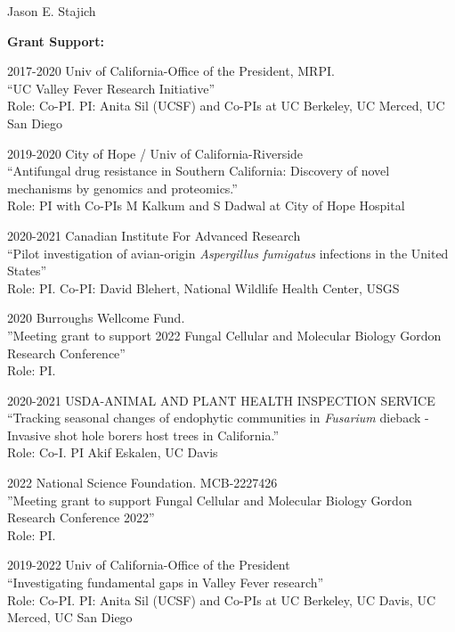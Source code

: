 \documentclass[10pt]{article}
\begin{document}
\begin{cv}{\centerline{Jason E. Stajich}}
\begin{cvlistcompact}{\bf Grant Support:}
\item [2017-2020] Univ of California-Office of the President, MRPI. \\
``UC Valley Fever Research Initiative'' \\
Role: Co-PI.  PI: Anita Sil (UCSF) and Co-PIs at UC Berkeley, UC Merced,
UC San Diego

\item [2019-2020] City of Hope / Univ of California-Riverside \\
``Antifungal drug resistance in Southern California: Discovery of
  novel mechanisms by genomics and proteomics.'' \\
Role: PI with Co-PIs M Kalkum and S Dadwal at City of Hope Hospital

\item [2020-2021] Canadian Institute For Advanced Research \\
  ``Pilot investigation of avian-origin \textit{Aspergillus fumigatus} infections
in the United States'' \\
Role: PI. Co-PI: David Blehert, National Wildlife Health Center, USGS

\item [2020] Burroughs Wellcome Fund. \\
''Meeting grant to support 2022 Fungal Cellular and Molecular Biology Gordon Research Conference'' \\
Role: PI.

\item [2020-2021] USDA-ANIMAL AND PLANT HEALTH INSPECTION SERVICE \\
``Tracking seasonal changes of endophytic communities in \textit{Fusarium} dieback - Invasive shot hole borers host trees in California.'' \\
Role: Co-I. PI Akif Eskalen, UC Davis

\item [2022] National Science Foundation. MCB-2227426 \\
''Meeting grant to support Fungal Cellular and Molecular Biology Gordon Research Conference 2022'' \\
Role: PI.

\item [2019-2022] Univ of California-Office of the President \\
``Investigating fundamental gaps in Valley Fever research'' \\
Role: Co-PI.  PI: Anita Sil (UCSF) and Co-PIs at UC Berkeley, UC
Davis, UC Merced, UC San Diego


\end{cvlistcompact}
\end{cv}
\end{document}
